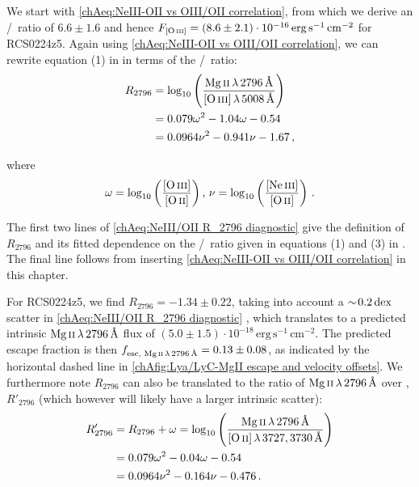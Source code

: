 We start with \cref{chAeq:NeIII-OII vs OIII/OII correlation}, from which we derive an \OIIIf/\OII\ ratio of $6.6 \pm 1.6$ and hence $F_\OIIIf = (8.6 \pm 2.1) \cdot 10^{-16} \, \mathrm{erg \, s^{-1} \, cm^{-2}}$ for RCS0224z5. Again using \cref{chAeq:NeIII-OII vs OIII/OII correlation}, we can rewrite equation (1) in \citet{2018ApJ...855...96H} in terms of the \NeIII/\OII\ ratio:
\begin{align}
    \label{chAeq:NeIII/OII R_2796 diagnostic}
    R_{2796} & = \log_{10} \left( \frac{\MgII \, \lambda \, 2796 \, \Angstrom}{\OIIIf \, \lambda \, 5008 \, \Angstrom} \right) \nonumber
    \\
    & = 0.079 \omega^2 - 1.04 \omega - 0.54 \nonumber
    \\
    & = 0.0964 \nu^2 - 0.941 \nu - 1.67 \, ,
\end{align}

\noindent where
\begin{equation*}
    \omega = \log_{10} \left( \frac{\OIIIf}{\OII} \right), \, \nu = \log_{10} \left( \frac{\NeIII}{\OII} \right) \, .
\end{equation*}

The first two lines of \cref{chAeq:NeIII/OII R_2796 diagnostic} give the definition of $R_{2796}$ and its fitted dependence on the \OIIIf/\OII\ ratio given in equations (1) and (3) in \citet{2018ApJ...855...96H}. The final line follows from inserting \cref{chAeq:NeIII-OII vs OIII/OII correlation} in this chapter.

For RCS0224z5, we find $R_{2796} = -1.34 \pm 0.22$, taking into account a $\sim \! 0.2 \, \mathrm{dex}$ scatter in \cref{chAeq:NeIII/OII R_2796 diagnostic} \citep[see][]{2018ApJ...855...96H}, which translates to a predicted intrinsic $\MgII \, \lambda \, 2796 \, \Angstrom$ flux of $(5.0 \pm 1.5) \cdot 10^{-18} \, \mathrm{erg \, s^{-1} \, cm^{-2}}$. The predicted escape fraction is then $f_{\text{esc, }\MgII \, \lambda \, 2796 \, \Angstrom} = 0.13 \pm 0.08$, as indicated by the horizontal dashed line in \cref{chAfig:Lya/LyC-MgII escape and velocity offsets}. We furthermore note $R_{2796}$ can also be translated to the ratio of $\MgII \, \lambda \, 2796 \, \Angstrom$ over \OII, $R'_{2796}$ (which however will likely have a larger intrinsic scatter):
\begin{align}
    R'_{2796} & = R_{2796} + \omega = \log_{10} \left( \frac{\MgII \, \lambda \, 2796 \, \Angstrom}{\OII \, \lambda \, 3727, 3730 \, \Angstrom} \right) \nonumber
    \\
    & = 0.079 \omega^2 - 0.04 \omega - 0.54 \nonumber
    \\
    & = 0.0964 \nu^2 - 0.164 \nu - 0.476 \, .
\end{align}

